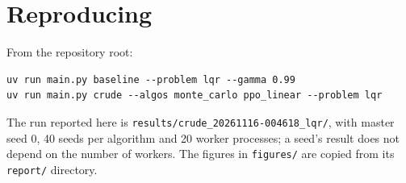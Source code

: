 \documentclass[11pt]{article}
\begin{document}
\section{Reproducing}

From the repository root:
\begin{verbatim}
uv run main.py baseline --problem lqr --gamma 0.99
uv run main.py crude --algos monte_carlo ppo_linear --problem lqr
\end{verbatim}
The run reported here is \texttt{results/crude\_20261116-004618\_lqr/}, with master seed 0, 40 seeds
per algorithm and 20 worker processes; a seed's result does not depend on the number of workers.
The figures in \texttt{figures/} are copied from its \texttt{report/} directory.
\end{document}
